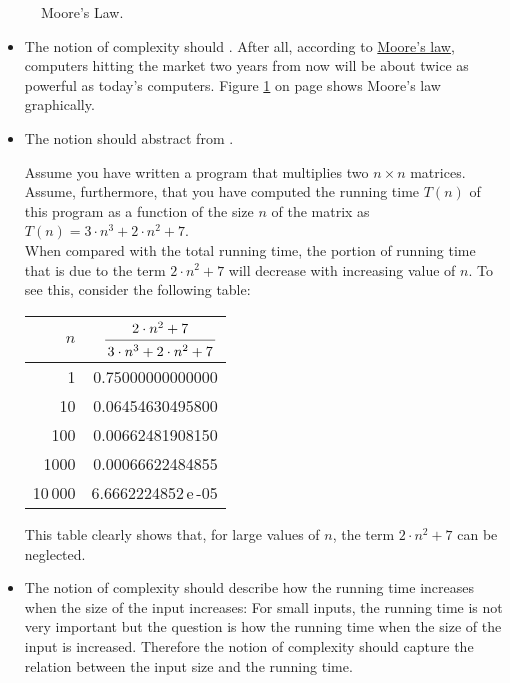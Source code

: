 \begin{figure}[t]
  \centering
  \caption{Moore's Law.} 
  \label{fig:moore.eps}
\end{figure}

\begin{itemize}
\item The notion of complexity should .  After all, according to 
      \href{http://en.wikipedia.org/wiki/Moore's_law}{Moore's law}, 
      computers hitting the market two years from now will be about twice as powerful as today's computers.
      Figure \ref{fig:moore.eps} on page \pageref{fig:moore.eps} shows Moore's law graphically.
      \FloatBarrier
\item The notion should abstract from .

      Assume you have written a program that  multiplies two $n \times n$ matrices.  Assume,
      furthermore, that you have computed the running time $T(n)$ of this program as a function 
      of the size $n$ of the matrix as
      \\[0.2cm]
      \hspace*{1.3cm} $T(n) = 3 \cdot n^3 + 2 \cdot n^2 + 7$. 
      \\[0.2cm]
      When compared with the total running time, the portion of running time that is due to the term 
      $2\cdot n^2 + 7$ will decrease with increasing value of $n$.  To see this, consider the
      following table:
      \\[0.3cm]
      \hspace*{1.3cm} 
      \begin{tabular}{|r|r|}
        \hline
        $n$  & \rule{0pt}{16pt} $\bruch{2 \cdot n^2 + 7}{3 \cdot n^3 + 2 \cdot n^2 + 7}$ \\[0.3cm]
        \hline
        \hline
        1       &  0.75000000000000  \\
        10      &  0.06454630495800  \\
        100     &  0.00662481908150  \\
        1000    &  0.00066622484855  \\
        10\,000 &  6.6662224852\,e\,-05  \\
       \hline
      \end{tabular}

      This table clearly shows that, for large values of $n$, the term $2 \cdot n^2 + 7$ can be
      neglected. 
\item The notion of complexity should describe how the running time increases
      when the size of the input increases:  For small inputs, the running time is not very
      important but the question is how the running time  when the size of the input is increased. 
      Therefore the notion of complexity should capture the relation between the input size and the running time.
\end{itemize}
